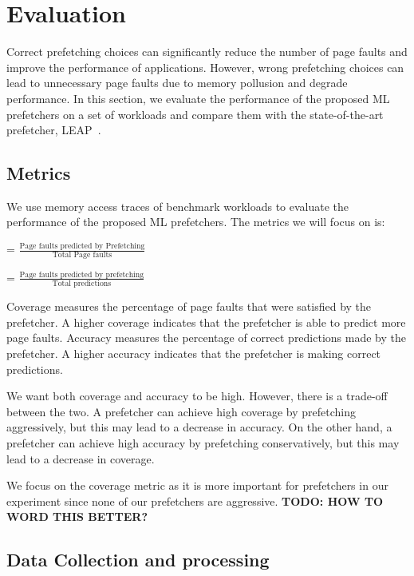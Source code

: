 
\section{Evaluation}
\label{sec:5}

Correct prefetching choices can significantly reduce the number of page faults and improve the performance of applications. However, wrong prefetching choices can lead to unnecessary page faults due to memory pollusion and degrade performance. In this section, we evaluate the performance of the proposed ML prefetchers on a set of workloads and compare them with the state-of-the-art prefetcher, LEAP~\cite{leap}.

\subsection{Metrics}

We use memory access traces of benchmark workloads to evaluate the performance of the proposed ML prefetchers. The metrics we will focus on is:

\begin{definition}
     = $\frac{\text{Page faults predicted by Prefetching}}{\text{Total Page faults}}$
\end{definition}

\begin{definition}
     = $\frac{\text{Page faults predicted by prefetching}}{\text{Total predictions}}$
\end{definition}

Coverage measures the percentage of page faults that were satisfied by the prefetcher. A higher coverage indicates that the prefetcher is able to predict more page faults. Accuracy measures the percentage of correct predictions made by the prefetcher. A higher accuracy indicates that the prefetcher is making correct predictions.

We want both coverage and accuracy to be high. However, there is a trade-off between the two. A prefetcher can achieve high coverage by prefetching aggressively, but this may lead to a decrease in accuracy. On the other hand, a prefetcher can achieve high accuracy by prefetching conservatively, but this may lead to a decrease in coverage. 

We focus on the coverage metric as it is more important for prefetchers in our experiment since none of our prefetchers are aggressive. \textbf{TODO: HOW TO WORD THIS BETTER?}

\subsection{Data Collection and processing}

